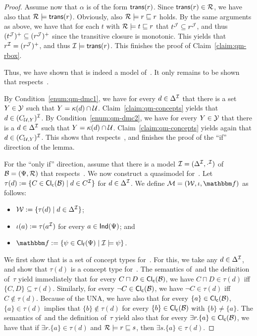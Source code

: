 \begin{proof}
    Assume now that $\alpha$ is of the form $\mathsf{trans}(r)$.  Since
    $\mathsf{trans}(r)\in\mathcal{R}$, we have also that $\mathcal{R}\models\mathsf{trans}(r)$.  Obviously,
    also $\mathcal{R}\models r\sqsubseteq r$ holds.  By the same arguments as above, we
    have that for each $t$ with $\mathcal{R}\models t\sqsubseteq r$ that
    $t^\mathcal{J}\subseteq r^\mathcal{J}$, and thus $(t^\mathcal{J})^+\subseteq(r^\mathcal{J})^+$ since the
    transitive closure is monotonic.  This yields that $r^\mathcal{I}=(r^\mathcal{J})^+$, and
    thus $\mathcal{I}\models\mathsf{trans}(r)$.
    This finishes the proof of Claim~\ref{claim:qm-rbox}.

    Thus, we have shown that \Imc is indeed a model of~\Bmc.  It only remains to
    be shown that \Imc respects~\Dmc.

    By Condition~\ref{enum:qm-dmc1}, we have for every $d\in\Delta^\mathcal{I}$ that
    there is a set $Y\in\mathcal{Y}$ such that $Y=\kappa(d)\cap\mathcal{U}$.
    Claim~\ref{claim:qm-concepts} yields that $d\in(C_{\mathcal{U},Y})^\mathcal{I}$.
    By Condition~\ref{enum:qm-dmc2}, we have for every $Y\in\mathcal{Y}$ that there is
    a $d\in\Delta^\mathcal{I}$ such that $Y=\kappa(d)\cap\mathcal{U}$.
    Claim~\ref{claim:qm-concepts} yields again that $d\in(C_{\mathcal{U},Y})^\mathcal{I}$.
    This shows that \Imc respects~\Dmc, and finishes the proof of the
    \enquote{if} direction of the lemma.

    For the \enquote{only if} direction, assume that there is a model
    $\mathcal{I}=(\Delta^\mathcal{I},\cdot^\mathcal{I})$ of $\mathcal{B}=(\Psi,\mathcal{R})$ that
    respects~\Dmc.
    We now construct a quasimodel for~\Bmc.  Let $\tau(d):=\{C\in\operatorname{\mathsf{Cl_c}}(\mathcal{B})\mid
    d\in C^\mathcal{I}\}$ for $d\in\Delta^\mathcal{I}$.  We define $\Mmc=(\Wmc,\iota,\fbb)$ as
    follows:
    \begin{itemize}
        \item $\mathcal{W}:=\{\tau(d)\mid d\in\Delta^\mathcal{I}\}$;
        \item $\iota(a):=\tau(a^\mathcal{I})$ for every $a\in\mathsf{Ind}(\Psi)$; and
        \item $\fbb:=\{\psi\in\FCl(\Psi)\mid\Imc\models\psi\}$.
    \end{itemize}
    We first show that \Wmc is a set of concept types for~\Bmc.  For this, we
    take any $d\in\Delta^\mathcal{I}$, and show that $\tau(d)$ is a concept type
    for~\Bmc.  The semantics of~\SHOQcap and the definition of~$\tau$ yield
    immediately that for every $C\sqcap D\in\operatorname{\mathsf{Cl_c}}(\mathcal{B})$, we have $C\sqcap
    D\in\tau(d)$ iff $\{C,D\}\subseteq\tau(d)$.  Similarly, for every $\lnot
    C\in\operatorname{\mathsf{Cl_c}}(\mathcal{B})$, we have $\lnot C\in\tau(d)$ iff $C\notin\tau(d)$.  Because
    of the UNA, we have also that for every $\{a\}\in\operatorname{\mathsf{Cl_c}}(\mathcal{B})$,
    $\{a\}\in\tau(d)$ implies that $\{b\}\notin\tau(d)$ for every
    $\{b\}\in\operatorname{\mathsf{Cl_c}}(\mathcal{B})$ with $\{b\}\ne\{a\}$.  The semantics of~\SHOQcap and
    the definition of~$\tau$ yield also that for every $\exists
    r.\{a\}\in\operatorname{\mathsf{Cl_c}}(\mathcal{B})$, we have that if $\exists r.\{a\}\in\tau(d)$ and
    $\mathcal{R}\models r\sqsubseteq s$, then $\exists s.\{a\}\in\tau(d)$.


\end{proof}
